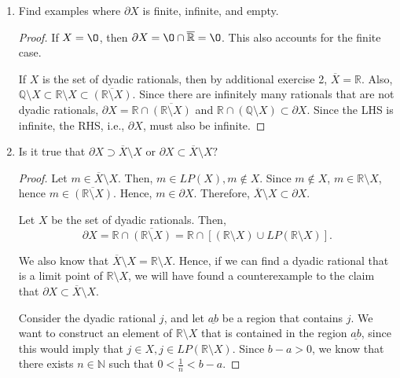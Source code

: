 \documentclass[11pt]{article}
\newcommand{\bbN}{\mathbb{N}}
\newcommand{\bbQ}{\mathbb{Q}}
\newcommand{\bbR}{\mathbb{R}}
\renewcommand{\emptyset}{\O}
\theoremstyle{definition}
\numberwithin{equation}{subsection}
\begin{document}
\begin{enumerate}
\begin{enumerate}
\begin{proof}
We know that $\overline{X}$ is closed and $\overline{(\bbR \setminus X)}$ is closed. Hence, $\partial X$ is an intersection of closed sets, hence it is closed.


\renewcommand\qedsymbol{QED}
\end{proof}
\item Find examples where $\partial X$ is finite, infinite, and empty. 
\begin{proof}

If $X = \emptyset$, then $\partial X = \emptyset \cap \overline{\bbR} = \emptyset$. This also accounts for the finite case.

If $X$ is the set of dyadic rationals, then by additional exercise 2, $\overline{X} = \bbR$. Also, $\bbQ \setminus X \subset \bbR \setminus X \subset \overline{(\bbR \setminus X)}$. Since there are infinitely many rationals that are not dyadic rationals, $\partial X = \bbR \cap \overline{(\bbR \setminus X)}$ and $\bbR \cap (\bbQ \setminus X) \subset \partial X$. Since the LHS is infinite, the RHS, i.e., $\partial X$, must also be infinite.

\renewcommand\qedsymbol{QED}
\end{proof}
\item Is it true that $\partial X\supset \overline{X}\setminus X$ or $\partial X\subset \overline{X}\setminus X?$ 
\begin{proof}
Let $m \in \overline{X}\setminus X$. Then, $m \in LP(X), m \notin X$. Since $m \notin X$, $m \in \bbR \setminus X$, hence $m \in \overline{(\bbR \setminus X)}$. Hence, $m \in \partial X$. Therefore, $\overline{X}\setminus X \subset \partial X$. 

Let $X$ be the set of dyadic rationals. Then, \[
\partial X = \bbR \cap \overline{(\bbR \setminus X)} = \bbR \cap [(\bbR \setminus X) \cup LP(\bbR \setminus X)].
\]

We also know that $\overline{X} \setminus X = \bbR \setminus X$. Hence, if we can find a dyadic rational that is a limit point of $\bbR \setminus X$, we will have found a counterexample to the claim that $\partial X\subset \overline{X}\setminus X$.

Consider the dyadic rational $j$, and let $\underline{ab}$ be a region that contains $j$. We want to construct an element of $\bbR \setminus X$ that is contained in the region $\underline{ab}$, since this would imply that $j \in X, j\in LP(\bbR \setminus X)$. Since $b-a >0$, we know that there exists $n \in \bbN$ such that $0<\frac{1}{n}<b-a$. 


\end{proof}
\end{enumerate}
\end{enumerate}
\end{document}
